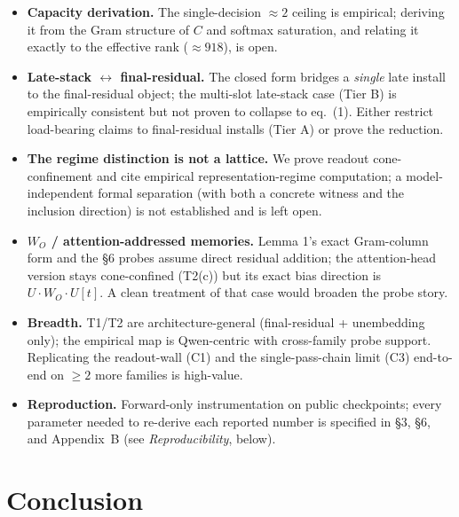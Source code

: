 \documentclass[11pt]{article}
\theoremstyle{plain}
\theoremstyle{definition}
\begin{document}
\begin{itemize}
\item \textbf{Capacity derivation.} The single-decision $\approx 2$ ceiling is empirical; deriving it from the Gram structure of $C$ and softmax saturation, and relating it exactly to the effective rank ($\approx 918$), is open.
\item \textbf{Late-stack $\leftrightarrow$ final-residual.} The closed form bridges a \emph{single} late install to the final-residual object; the multi-slot late-stack case (Tier B) is empirically consistent but not proven to collapse to eq.~(1). Either restrict load-bearing claims to final-residual installs (Tier A) or prove the reduction.
\item \textbf{The regime distinction is not a lattice.} We prove readout cone-confinement and cite empirical representation-regime computation; a model-independent formal separation (with both a concrete witness and the inclusion direction) is not established and is left open.
\item \textbf{$W_O$ / attention-addressed memories.} Lemma 1's exact Gram-column form and the \S 6 probes assume direct residual addition; the attention-head version stays cone-confined (T2(c)) but its exact bias direction is $U\cdot W_O\cdot U[t]$. A clean treatment of that case would broaden the probe story.
\item \textbf{Breadth.} T1/T2 are architecture-general (final-residual + unembedding only); the empirical map is Qwen-centric with cross-family probe support. Replicating the readout-wall (C1) and the single-pass-chain limit (C3) end-to-end on $\ge 2$ more families is high-value.
\item \textbf{Reproduction.} Forward-only instrumentation on public checkpoints; every parameter needed to re-derive each reported number is specified in \S 3, \S 6, and Appendix~B (see \emph{Reproducibility}, below).
\end{itemize}

\section{Conclusion}
\end{document}
